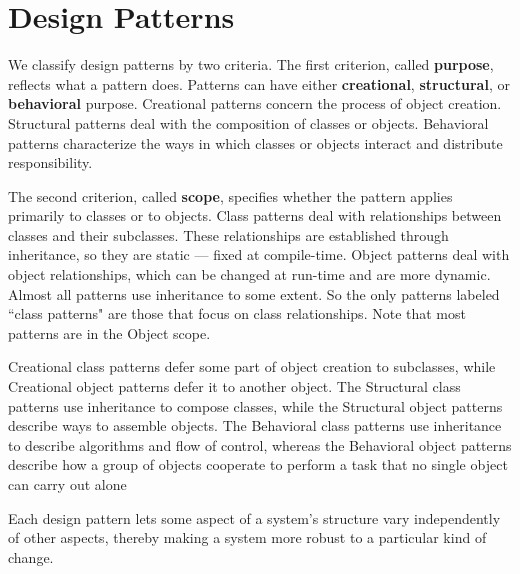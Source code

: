 \documentclass{article}
\begin{document}
\newpage
\section{Design Patterns}

We classify design patterns by two criteria. The first criterion, called \textbf{purpose}, reflects what a pattern does. Patterns can have either \textbf{creational}, \textbf{structural}, or \textbf{behavioral} purpose. Creational patterns concern the process of object creation. Structural patterns deal with the composition of classes or objects. Behavioral patterns characterize the ways in which classes or objects interact and distribute responsibility.

The second criterion, called \textbf{scope}, specifies whether the pattern applies primarily to classes or to objects. Class patterns deal with relationships between classes and their subclasses. These relationships are established through inheritance, so they are static — fixed at compile-time. Object patterns deal with object relationships, which can be changed at run-time and are more dynamic. Almost all patterns use inheritance to some extent. So the only patterns labeled ``class patterns" are those that focus on class relationships. Note that most patterns are in the Object scope.

Creational class patterns defer some part of object creation to subclasses, while Creational object patterns defer it to another object. The Structural class patterns use inheritance to compose classes, while the Structural object patterns describe ways to assemble objects. The Behavioral class patterns use inheritance to describe algorithms and flow of control, whereas the Behavioral object patterns describe how a group of objects cooperate to perform a task that no single object can carry out alone

Each design pattern lets some aspect of a system's structure vary independently of other aspects, thereby making a system more robust to a particular kind of change.
\end{document}
